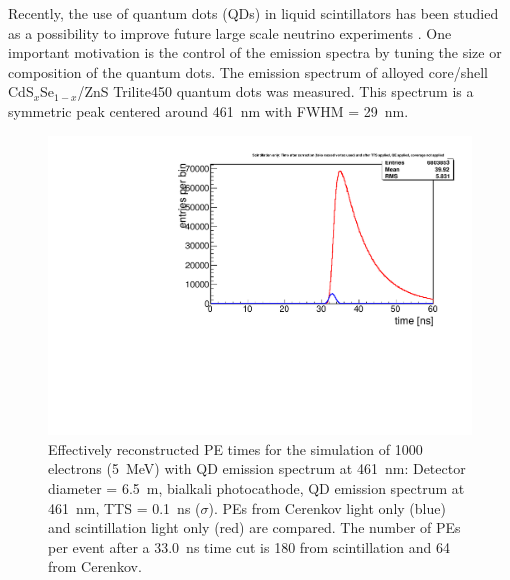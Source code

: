 \documentclass[aps,prc,twocolumn,groupedaddress,showpacs,amsmath,amssymb,floatfix,superscriptaddress]{revtex4}
\begin{document}
Recently, the use of quantum dots (QDs) in liquid scintillators has been studied as a possibility to improve future large scale neutrino experiments \cite{tbd}. One important motivation is the control of the emission spectra by tuning the size or composition of the quantum dots. The emission spectrum of alloyed core/shell CdS$_x$Se$_{1-x}$/ZnS Trilite450 \cite{tbd} quantum dots was measured. This spectrum is a symmetric peak centered around 461~nm with FWHM = 29~nm. 

\begin{figure}
        \begin{center}
        \includegraphics[scale=0.40]{graphs/6p5Meter_5MeVElectrons_Bialkali_QD461nmScintSpec_TIME.pdf}
        \caption[]{Effectively reconstructed PE times for the simulation of 1000 electrons (5~MeV) with QD emission spectrum at 461~nm: Detector diameter = 6.5~m, bialkali photocathode, QD emission spectrum at 461~nm, TTS = 0.1~ns ($\sigma$). PEs from Cerenkov light only (blue) and scintillation light only (red) are compared. The number of PEs per event after a 33.0~ns time cut is 180 from scintillation and 64 from Cerenkov. \label{6p5Meter_5MeVElectrons_Bialkali_QD461nmScintSpec_TIME}}
        \end{center}
\end{figure}  
\end{document}
